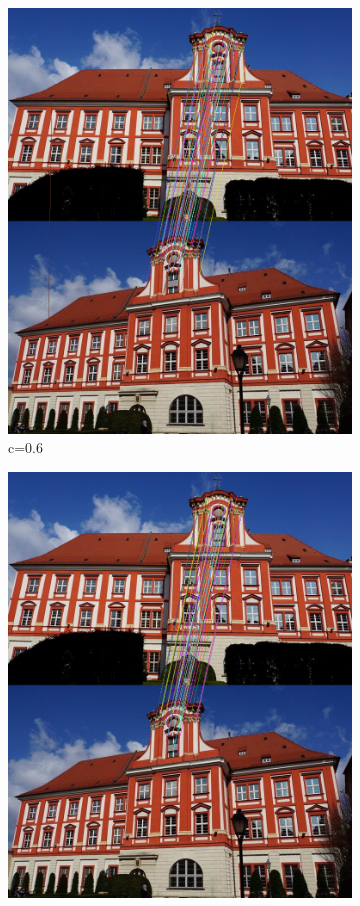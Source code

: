 \documentclass{article}
\begin{document}
\begin{figure}[H]
\begin{subfigure}[b]{0.4\linewidth}
			\includegraphics[width=\linewidth]{c06.png}
			\caption{c=0.6}
		\end{subfigure}
		\begin{subfigure}[b]{0.4\linewidth}
			\includegraphics[width=\linewidth]{c07.png}

\end{subfigure}
\end{figure}
\end{document}
